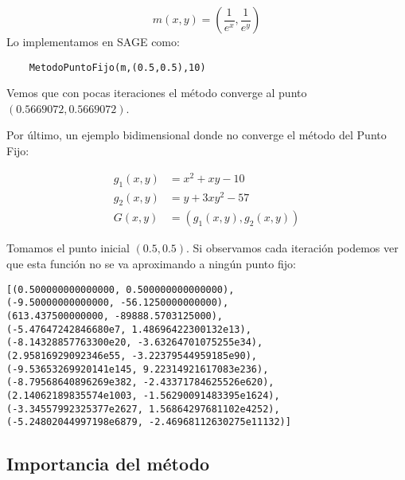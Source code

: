 \begin{example}
	$$m(x,y) = (\frac{1}{e^{x}},\frac{1}{e^{y}})$$
Lo implementamos en SAGE como:
\begin{verbatim}
	MetodoPuntoFijo(m,(0.5,0.5),10)
\end{verbatim}

Vemos que con pocas iteraciones el método converge al punto $(0.5669072, 0.5669072)$.

\end{example}

Por último, un ejemplo bidimensional donde no converge el método del Punto Fijo:
\begin{example}
$$
\begin{matrix}
	g_1(x,y) & = x^2+xy-10 \\
	g_2(x,y) & = y + 3xy^2 - 57 \\
	G(x,y)   & = (g_1(x,y),g_2(x,y))
\end{matrix}
$$

Tomamos el punto inicial $(0.5,0.5)$. Si observamos cada iteración podemos ver que esta función no se va aproximando a ningún punto fijo:

\begin{verbatim}
[(0.500000000000000, 0.500000000000000),
(-9.50000000000000, -56.1250000000000),
(613.437500000000, -89888.5703125000),
(-5.47647242846680e7, 1.48696422300132e13),
(-8.14328857763300e20, -3.63264701075255e34),
(2.95816929092346e55, -3.22379544959185e90),
(-9.53653269920141e145, 9.22314921617083e236),
(-8.79568640896269e382, -2.43371784625526e620),
(2.14062189835574e1003, -1.56290091483395e1624),
(-3.34557992325377e2627, 1.56864297681102e4252),
(-5.24802044997198e6879, -2.46968112630275e11132)]
\end{verbatim}

	
\end{example}
                                           
%

\subsection{Importancia del método}

